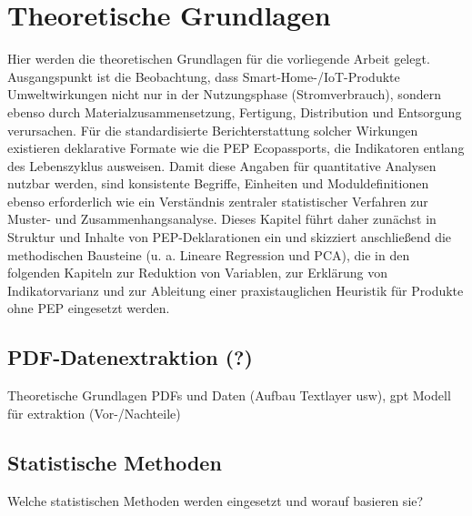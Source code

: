 \chapter{Theoretische Grundlagen}

Hier werden die theoretischen Grundlagen für die vorliegende Arbeit gelegt. 
Ausgangspunkt ist die Beobachtung, dass Smart-Home-/IoT-Produkte Umweltwirkungen nicht nur in der Nutzungsphase (Stromverbrauch), 
sondern ebenso durch Materialzusammensetzung, Fertigung, Distribution und Entsorgung verursachen. 
Für die standardisierte Berichterstattung solcher Wirkungen existieren deklarative Formate wie die PEP Ecopassports, 
die Indikatoren entlang des Lebenszyklus ausweisen. Damit diese Angaben für quantitative Analysen nutzbar werden, 
sind konsistente Begriffe, Einheiten und Moduldefinitionen ebenso erforderlich wie ein Verständnis zentraler 
statistischer Verfahren zur Muster- und Zusammenhangsanalyse. Dieses Kapitel führt daher zunächst in Struktur 
und Inhalte von PEP-Deklarationen ein und skizziert anschließend die methodischen Bausteine 
(u. a. Lineare Regression und PCA), die in den folgenden Kapiteln zur Reduktion von Variablen, 
zur Erklärung von Indikatorvarianz und zur Ableitung einer praxistauglichen Heuristik für Produkte ohne PEP eingesetzt werden.



\section{PDF-Datenextraktion (?)}
Theoretische Grundlagen PDFs und Daten (Aufbau Textlayer usw), gpt Modell für extraktion (Vor-/Nachteile)

\section{Statistische Methoden}
Welche statistischen Methoden werden eingesetzt und worauf basieren sie?

